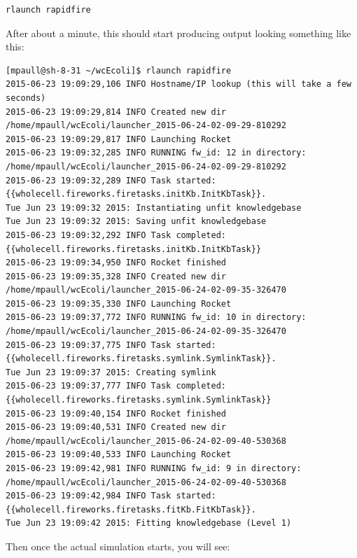 \documentclass[12pt]{article}
\begin{document}
\begin{lstlisting}
rlaunch rapidfire
\end{lstlisting}

After about a minute, this should start producing output looking something like this:

\begin{lstlisting}
[mpaull@sh-8-31 ~/wcEcoli]$ rlaunch rapidfire
2015-06-23 19:09:29,106 INFO Hostname/IP lookup (this will take a few seconds)
2015-06-23 19:09:29,814 INFO Created new dir /home/mpaull/wcEcoli/launcher_2015-06-24-02-09-29-810292
2015-06-23 19:09:29,817 INFO Launching Rocket
2015-06-23 19:09:32,285 INFO RUNNING fw_id: 12 in directory: /home/mpaull/wcEcoli/launcher_2015-06-24-02-09-29-810292
2015-06-23 19:09:32,289 INFO Task started: {{wholecell.fireworks.firetasks.initKb.InitKbTask}}.
Tue Jun 23 19:09:32 2015: Instantiating unfit knowledgebase
Tue Jun 23 19:09:32 2015: Saving unfit knowledgebase
2015-06-23 19:09:32,292 INFO Task completed: {{wholecell.fireworks.firetasks.initKb.InitKbTask}} 
2015-06-23 19:09:34,950 INFO Rocket finished
2015-06-23 19:09:35,328 INFO Created new dir /home/mpaull/wcEcoli/launcher_2015-06-24-02-09-35-326470
2015-06-23 19:09:35,330 INFO Launching Rocket
2015-06-23 19:09:37,772 INFO RUNNING fw_id: 10 in directory: /home/mpaull/wcEcoli/launcher_2015-06-24-02-09-35-326470
2015-06-23 19:09:37,775 INFO Task started: {{wholecell.fireworks.firetasks.symlink.SymlinkTask}}.
Tue Jun 23 19:09:37 2015: Creating symlink
2015-06-23 19:09:37,777 INFO Task completed: {{wholecell.fireworks.firetasks.symlink.SymlinkTask}} 
2015-06-23 19:09:40,154 INFO Rocket finished
2015-06-23 19:09:40,531 INFO Created new dir /home/mpaull/wcEcoli/launcher_2015-06-24-02-09-40-530368
2015-06-23 19:09:40,533 INFO Launching Rocket
2015-06-23 19:09:42,981 INFO RUNNING fw_id: 9 in directory: /home/mpaull/wcEcoli/launcher_2015-06-24-02-09-40-530368
2015-06-23 19:09:42,984 INFO Task started: {{wholecell.fireworks.firetasks.fitKb.FitKbTask}}.
Tue Jun 23 19:09:42 2015: Fitting knowledgebase (Level 1)
 \end{lstlisting}



\hfill \break
\hfill \break



Then once the actual simulation starts, you will see:

\hfill \break
\hfill \break
\end{document}
